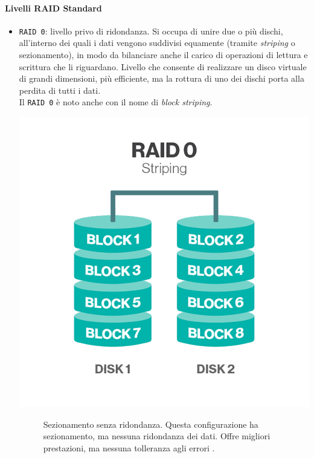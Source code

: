 \paragraph{Livelli RAID Standard}
\begin{itemize}
\item 
\verb"RAID 0": livello privo di ridondanza. Si occupa di unire due o pi\`{u} dischi, all'interno dei quali i dati vengono suddivisi equamente (tramite \textit{striping} o sezionamento), in modo da bilanciare anche il carico di operazioni di lettura e scrittura che li riguardano. Livello che consente di realizzare un disco virtuale di grandi dimensioni, pi\`{u} efficiente, ma la rottura di uno dei dischi porta alla perdita di tutti i dati\cite{etichetta9}. \\
Il \verb"RAID 0" \`{e} noto anche con il nome di \textit{block striping}.\\

\begin{center}
\includegraphics[scale=0.40]{img/raid00.png}
\end{center}
\begin{figure}[htbp]
\caption{Sezionamento senza ridondanza. Questa configurazione ha sezionamento, ma nessuna ridondanza dei dati. Offre migliori prestazioni, ma nessuna tolleranza agli errori \cite{etichetta9}.}
\label{fig:raid00}
\end{figure}


\end{itemize}
